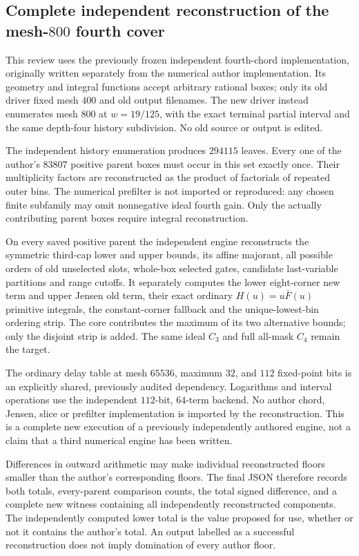 \subsection{Complete independent reconstruction of the mesh-$800$ fourth cover}

This review uses the previously frozen independent fourth-chord
implementation, originally written separately from the numerical
author implementation. Its geometry and integral functions accept
arbitrary rational boxes; only its old driver fixed mesh $400$ and
old output filenames. The new driver instead enumerates mesh $800$
at $w=19/125$, with the exact terminal partial interval and the same
depth-four history subdivision. No old source or output is edited.

The independent history enumeration produces $294115$ leaves. Every
one of the author's $83807$ positive parent boxes must occur in this
set exactly once. Their multiplicity factors are reconstructed as
the product of factorials of repeated outer bins. The numerical
prefilter is not imported or reproduced: any chosen finite subfamily
may omit nonnegative ideal fourth gain. Only the actually contributing
parent boxes require integral reconstruction.

On every saved positive parent the independent engine reconstructs
the symmetric third-cap lower and upper bounds, its affine majorant,
all possible orders of old unselected slots, whole-box selected gates,
candidate last-variable partitions and range cutoffs. It separately
computes the lower eight-corner new term and upper Jensen old term,
their exact ordinary $H(u)=u\bar F(u)$ primitive integrals, the
constant-corner fallback and the unique-lowest-bin ordering strip.
The core contributes the maximum of its two alternative bounds;
only the disjoint strip is added. The same ideal $C_3$ and full
all-mask $C_4$ remain the target.

The ordinary delay table at mesh $65536$, maximum $32$, and $112$
fixed-point bits is an explicitly shared, previously audited
dependency. Logarithms and interval operations use the independent
$112$-bit, $64$-term backend. No author chord, Jensen, slice or
prefilter implementation is imported by the reconstruction. This
is a complete new execution of a previously independently authored
engine, not a claim that a third numerical engine has been written.

Differences in outward arithmetic may make individual reconstructed
floors smaller than the author's corresponding floors. The final
JSON therefore records both totals, every-parent comparison counts,
the total signed difference, and a complete new witness containing
all independently reconstructed components. The independently
computed lower total is the value proposed for use, whether or not
it contains the author's total. An output labelled as a successful
reconstruction does not imply domination of every author floor.

